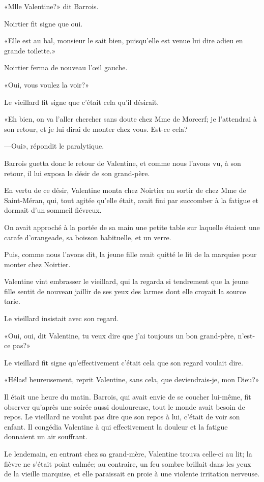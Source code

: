«Mlle Valentine?» dit Barrois. 

Noirtier fit signe que oui. 

«Elle est au bal, monsieur le sait bien, puisqu'elle est venue lui dire adieu en grande toilette.» 

Noirtier ferma de nouveau l'œil gauche. 

«Oui, vous voulez la voir?»  

Le vieillard fit signe que c'était cela qu'il désirait. 

«Eh bien, on va l'aller chercher sans doute chez Mme de Morcerf; je l'attendrai à son retour, et je lui dirai de monter chez vous. Est-ce cela? 

—Oui», répondit le paralytique. 

Barrois guetta donc le retour de Valentine, et comme nous l'avons vu, à son retour, il lui exposa le désir de son grand-père. 

En vertu de ce désir, Valentine monta chez Noirtier au sortir de chez Mme de Saint-Méran, qui, tout agitée qu'elle était, avait fini par succomber à la fatigue et dormait d'un sommeil fiévreux. 

On avait approché à la portée de sa main une petite table sur laquelle étaient une carafe d'orangeade, sa boisson habituelle, et un verre. 

Puis, comme nous l'avons dit, la jeune fille avait quitté le lit de la marquise pour monter chez Noirtier. 

Valentine vint embrasser le vieillard, qui la regarda si tendrement que la jeune fille sentit de nouveau jaillir de ses yeux des larmes dont elle croyait la source tarie. 

Le vieillard insistait avec son regard. 

«Oui, oui, dit Valentine, tu veux dire que j'ai toujours un bon grand-père, n'est-ce pas?» 

Le vieillard fit signe qu'effectivement c'était cela que son regard voulait dire. 

«Hélas! heureusement, reprit Valentine, sans cela, que deviendrais-je, mon Dieu?» 

Il était une heure du matin. Barrois, qui avait envie de se coucher lui-même, fit observer qu'après une soirée aussi douloureuse, tout le monde avait besoin de repos. Le vieillard ne voulut pas dire que son repos à lui, c'était de voir son enfant. Il congédia Valentine à qui effectivement la douleur et la fatigue donnaient un air souffrant. 

Le lendemain, en entrant chez sa grand-mère, Valentine trouva celle-ci au lit; la fièvre ne s'était point calmée; au contraire, un feu sombre brillait dans les yeux de la vieille marquise, et elle paraissait en proie à une violente irritation nerveuse. 

